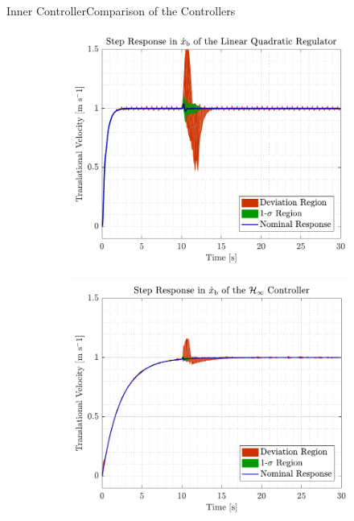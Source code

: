 \begin{frame}{Inner Controller}{Comparison of the Controllers}
\begin{figure}[H]
  \begin{minipage}{0.45\linewidth}
    \begin{figure}[H]
      \centering
      \includegraphics[width=1\linewidth]{figures/xbdot_mc_lqr}
    \end{figure}        
  \end{minipage}\hfill      
  \begin{minipage}{0.45\linewidth}
    \begin{figure}[H]
      \centering
      \includegraphics[width=1\linewidth]{figures/xbdot_mc_rob}

\end{figure}
\end{minipage}
\end{figure}
\end{frame}

